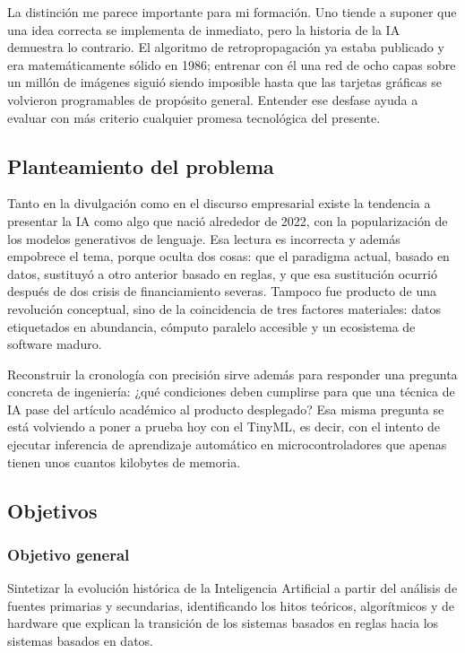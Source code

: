 \documentclass[12pt,letterpaper,oneside]{article}
\begin{document}
La distinción me parece importante para mi formación. Uno tiende a suponer que una idea correcta se implementa de inmediato, pero la historia de la IA demuestra lo contrario. El algoritmo de retropropagación ya estaba publicado y era matemáticamente sólido en 1986; entrenar con él una red de ocho capas sobre un millón de imágenes siguió siendo imposible hasta que las tarjetas gráficas se volvieron programables de propósito general. Entender ese desfase ayuda a evaluar con más criterio cualquier promesa tecnológica del presente.

\subsection{Planteamiento del problema}

Tanto en la divulgación como en el discurso empresarial existe la tendencia a presentar la IA como algo que nació alrededor de 2022, con la popularización de los modelos generativos de lenguaje. Esa lectura es incorrecta y además empobrece el tema, porque oculta dos cosas: que el paradigma actual, basado en datos, sustituyó a otro anterior basado en reglas, y que esa sustitución ocurrió después de dos crisis de financiamiento severas. Tampoco fue producto de una revolución conceptual, sino de la coincidencia de tres factores materiales: datos etiquetados en abundancia, cómputo paralelo accesible y un ecosistema de software maduro.

Reconstruir la cronología con precisión sirve además para responder una pregunta concreta de ingeniería: ¿qué condiciones deben cumplirse para que una técnica de IA pase del artículo académico al producto desplegado? Esa misma pregunta se está volviendo a poner a prueba hoy con el TinyML, es decir, con el intento de ejecutar inferencia de aprendizaje automático en microcontroladores que apenas tienen unos cuantos kilobytes de memoria.

\subsection{Objetivos}

\subsubsection{Objetivo general}

Sintetizar la evolución histórica de la Inteligencia Artificial a partir del análisis de fuentes primarias y secundarias, identificando los hitos teóricos, algorítmicos y de hardware que explican la transición de los sistemas basados en reglas hacia los sistemas basados en datos.
\end{document}
